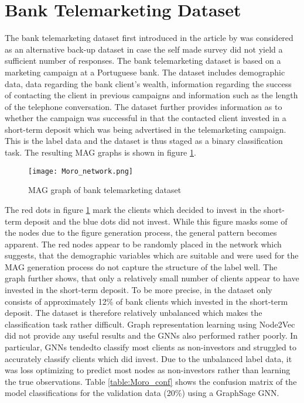   \section{Bank Telemarketing Dataset}

  The bank telemarketing dataset first introduced in the article by
  \cite{moro2011using,moro2014data} was considered as an alternative back-up 
  dataset in case the self made survey did not yield a sufficient number of 
  responses. The bank telemarketing dataset is based on a marketing campaign at 
  a Portuguese bank. The dataset includes demographic data, data regarding the 
  bank client's wealth, information regarding the success of contacting the 
  client in previous campaigns and information such as the length of the 
  telephone conversation. The dataset further provides information as to whether 
  the campaign was successful in that the contacted client invested in a short-term 
  deposit which was being advertised in the telemarketing campaign. This is the
  label data and the dataset is thus staged as a binary classification task.
  The resulting MAG graphs is shown in figure \ref{fig:Moro}.
 
	\begin{figure}[h]
		\centering
		\texttt{[image: Moro\_network.png]}
		\caption{MAG graph of bank telemarketing dataset}
        \label{fig:Moro}
	\end{figure}
  
  \noindent The red dots in figure \ref{fig:Moro} mark the clients which
  decided to invest in the short-term deposit and the blue dots did not invest.
  While this figure masks some of the nodes due to the figure generation
  process, the general pattern becomes apparent. The red nodes appear to be 
  randomly placed in the network which suggests, that the demographic variables 
  which are suitable and were used for the MAG generation process do not
  capture the structure of the label well. The graph further shows, that only a
  relatively small number of clients appear to have invested in the short-term
  deposit. To be more precise, in the dataset only consists of approximately 
  12\% of bank clients which invested in the short-term deposit. The dataset is 
  therefore relatively unbalanced which makes the classification task rather 
  difficult. Graph representation learning using Node2Vec did not provide any 
  useful results and the GNNs also performed rather poorly. In particular, GNNs 
  tendedto classify most clients as non-investors and struggled to accurately
  classify clients which did invest. Due to the unbalanced label data, it was
  loss optimizing to predict most nodes as non-investors rather than learning
  the true observations. Table \ref{table:Moro_conf} shows the confusion matrix
  of the model classifications for the validation data (20\%) using a GraphSage
  GNN.

